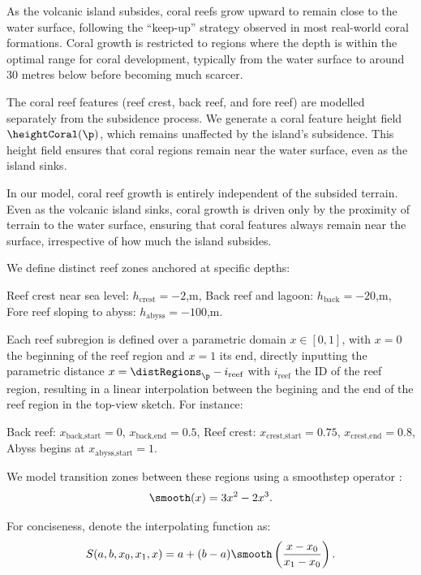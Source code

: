 As the volcanic island subsides, coral reefs grow upward to remain close to the water surface, following the “keep-up” strategy observed in most real-world coral formations. Coral growth is restricted to regions where the depth is within the optimal range for coral development, typically from the water surface to around 30 metres below before becoming much scarcer.

The coral reef features (reef crest, back reef, and fore reef) are modelled separately from the subsidence process. We generate a coral feature height field $\heightCoral(\p)$, which remains unaffected by the island's subsidence. This height field ensures that coral regions remain near the water surface, even as the island sinks.

In our model, coral reef growth is entirely independent of the subsided terrain. Even as the volcanic island sinks, coral growth is driven only by the proximity of terrain to the water surface, ensuring that coral features always remain near the surface, irrespective of how much the island subsides.

We define distinct reef zones anchored at specific depths:
\begin{Itemize}
    \Item{} Reef crest near sea level: $h_\text{crest} = -2$,m,
    \Item{} Back reef and lagoon: $h_\text{back} = -20$,m,
    \Item{} Fore reef sloping to abyss: $h_\text{abyss} = -100$,m.
\end{Itemize}

Each reef subregion is defined over a parametric domain $x \in [0, 1]$, with $x = 0$ the beginning of the reef region and $x = 1$ its end, directly inputting the parametric distance $x = \distRegions_\p - i_{\text{reef}}$ with $i_\text{reef}$ the ID of the reef region, resulting in a linear interpolation between the begining and the end of the reef region in the top-view sketch. For instance:
\begin{Itemize}
    \Item{} Back reef: $x_{\text{back,start}} = 0$, $x_{\text{back,end}} = 0.5$,
    \Item{} Reef crest: $x_{\text{crest,start}} = 0.75$, $x_{\text{crest,end}} = 0.8$,
    \Item{} Abyss begins at $x_{\text{abyss,start}} = 1$.
\end{Itemize}

We model transition zones between these regions using a smoothstep operator \cite{Perlin2002}:
\begin{align}
    \smooth(x) = 3x^2 - 2x^3.
\end{align}

For conciseness, denote the interpolating function as:
\begin{align}
    S(a, b, x_0, x_1, x) = a + (b-a) \smooth\left(\frac{x - x_0}{x_1 - x_0}\right).
\end{align}

